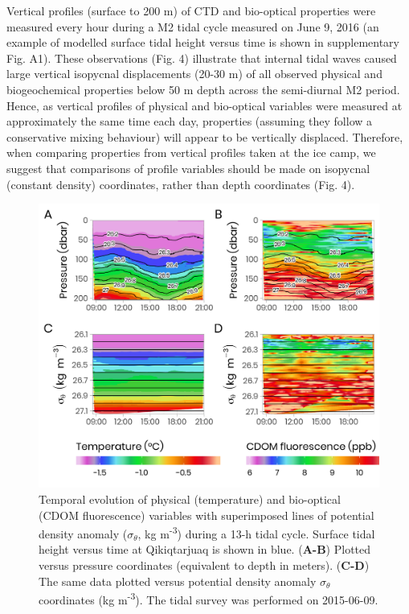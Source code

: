 \documentclass[essd, manuscript]{copernicus}
\begin{document}
Vertical profiles (surface to 200 m) of CTD and bio-optical properties were measured every hour during a M2 tidal cycle measured on June 9, 2016 (an example of modelled surface tidal height versus time is shown in supplementary Fig. A1). These observations (Fig. 4) illustrate that internal tidal waves caused large vertical isopycnal displacements (20-30 m) of all observed physical and biogeochemical properties below 50 m depth across the semi-diurnal M2 period. Hence, as vertical profiles of physical and bio-optical variables were measured at approximately the same time each day, properties (assuming they follow a conservative mixing behaviour) will appear to be vertically displaced. Therefore, when comparing properties from vertical profiles taken at the ice camp, we suggest that comparisons of profile variables should be made on isopycnal (constant density) coordinates, rather than depth coordinates (Fig. 4).

\begin{figure}[H]
	\centering
	\includegraphics[scale = 1]{../../../../graphs/fig04.png}
	\caption{Temporal evolution of physical (temperature) and bio-optical (CDOM fluorescence) variables with superimposed lines of potential density anomaly ($\sigma_\theta$, kg m\textsuperscript{-3}) during a 13-h tidal cycle. Surface tidal height versus time at Qikiqtarjuaq is shown in blue. (\textbf{A-B}) Plotted versus pressure coordinates (equivalent to depth in meters). (\textbf{C-D}) The same data plotted versus potential density anomaly $\sigma_\theta$ coordinates (kg m\textsuperscript{-3}). The tidal survey was performed on 2015-06-09.}
\end{figure}
\end{document}
